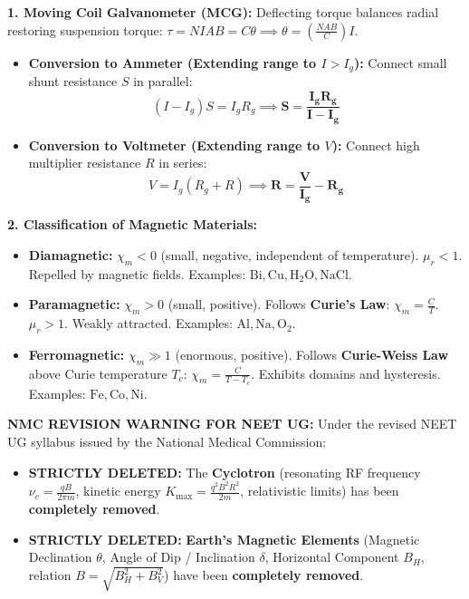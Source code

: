 \documentclass[10pt,a4paper]{article}
\begin{document}
\begin{formulabox}
\textbf{1. Moving Coil Galvanometer (MCG):}
Deflecting torque balances radial restoring suspension torque: $\tau = N I A B = C \theta \implies \theta = \left(\frac{NAB}{C}\right)I$.
\begin{itemize}
  \item \textbf{Conversion to Ammeter (Extending range to $I > I_g$):} Connect small shunt resistance $S$ in parallel:
  \begin{equation}
    (I - I_g) S = I_g R_g \implies \mathbf{S = \frac{I_g R_g}{I - I_g}}
  \end{equation}
  \item \textbf{Conversion to Voltmeter (Extending range to $V$):} Connect high multiplier resistance $R$ in series:
  \begin{equation}
    V = I_g (R_g + R) \implies \mathbf{R = \frac{V}{I_g} - R_g}
  \end{equation}
\end{itemize}
\textbf{2. Classification of Magnetic Materials:}
\begin{itemize}
  \item \textbf{Diamagnetic:} $\chi_m < 0$ (small, negative, independent of temperature). $\mu_r < 1$. Repelled by magnetic fields. Examples: $\mathrm{Bi, Cu, H_2O, NaCl}$.
  \item \textbf{Paramagnetic:} $\chi_m > 0$ (small, positive). Follows \textbf{Curie's Law}: $\chi_m = \frac{C}{T}$. $\mu_r > 1$. Weakly attracted. Examples: $\mathrm{Al, Na, O_2}$.
  \item \textbf{Ferromagnetic:} $\chi_m \gg 1$ (enormous, positive). Follows \textbf{Curie-Weiss Law} above Curie temperature $T_c$: $\chi_m = \frac{C}{T - T_c}$. Exhibits domains and hysteresis. Examples: $\mathrm{Fe, Co, Ni}$.
\end{itemize}
\end{formulabox}

\begin{trapbox}
\textbf{NMC REVISION WARNING FOR NEET UG:}
Under the revised NEET UG syllabus issued by the National Medical Commission:
\begin{itemize}
  \item \textbf{STRICTLY DELETED:} The \textbf{Cyclotron} (resonating RF frequency $\nu_c = \frac{qB}{2\pi m}$, kinetic energy $K_{\max} = \frac{q^2 B^2 R^2}{2m}$, relativistic limits) has been \textbf{completely removed}.
  \item \textbf{STRICTLY DELETED:} \textbf{Earth's Magnetic Elements} (Magnetic Declination $\theta$, Angle of Dip / Inclination $\delta$, Horizontal Component $B_H$, relation $B = \sqrt{B_H^2 + B_V^2}$) have been \textbf{completely removed}.
\end{itemize}
\end{trapbox}
\end{document}
